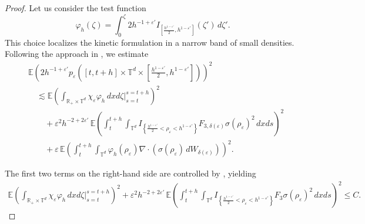 \documentclass[UTF-8,reqno]{amsart}
\numberwithin{equation}{section}
\def\leq{\leqslant}
\def\leq{\leqslant}
\begin{document}
\begin{proof}
Let us consider the test function
$$
\varphi_h(\zeta) = \int_0^{\zeta} 2 h^{-1 + \varepsilon'} I_{\left[\frac{h^{1 - \varepsilon'}}{2}, h^{1 - \varepsilon'}\right]}(\zeta') \, d\zeta'. 
$$
This choice localizes the kinetic formulation in a narrow band of small densities. Following the approach in \cite[Proposition 4.5]{FG24}, we estimate
\begin{align*}
&\mathbb{E}\left(2 h^{-1 + \varepsilon'} p_{\varepsilon}\left([t, t + h] \times \mathbb{T}^d \times \left[\frac{h^{1 - \varepsilon'}}{2}, h^{1 - \varepsilon'}\right]\right)\right)^2 \\
&\quad\lesssim \mathbb{E}\left( \int_{\mathbb{R}_+ \times \mathbb{T}^d} \chi_{\varepsilon} \varphi_h \, dx d\zeta \Big|_{s = t}^{s = t + h} \right)^2 \\
&\qquad+ \varepsilon^2 h^{-2 + 2\varepsilon'} \, \mathbb{E}\left( \int_t^{t + h} \int_{\mathbb{T}^d} I_{\left\{ \frac{h^{1 - \varepsilon'}}{2} < \rho_{\varepsilon} < h^{1 - \varepsilon'} \right\}} F_{3,\delta(\varepsilon)} \sigma(\rho_{\varepsilon})^2 \, dx ds \right)^2 \\
&\qquad+ \varepsilon \, \mathbb{E} \left( \int_t^{t + h} \int_{\mathbb{T}^d} \varphi_h(\rho_{\varepsilon}) \nabla \cdot (\sigma(\rho_{\varepsilon}) \, dW_{\delta(\varepsilon)}) \right)^2.
\end{align*}

The first two terms on the right-hand side are controlled by \cite[Proposition 4.5]{FG24}, yielding
\begin{align*}
\mathbb{E}\left( \int_{\mathbb{R}_+ \times \mathbb{T}^d} \chi_{\varepsilon} \varphi_h \, dx d\zeta \Big|_{s = t}^{s = t + h} \right)^2 
+ \varepsilon^2 h^{-2 + 2\varepsilon'} \, \mathbb{E}\left( \int_t^{t + h} \int_{\mathbb{T}^d} I_{\left\{ \frac{h^{1 - \varepsilon'}}{2} < \rho_{\varepsilon} < h^{1 - \varepsilon'} \right\}} F_3 \sigma(\rho_{\varepsilon})^2 \, dx ds \right)^2 
\leq C.
\end{align*}


\end{proof}
\end{document}
